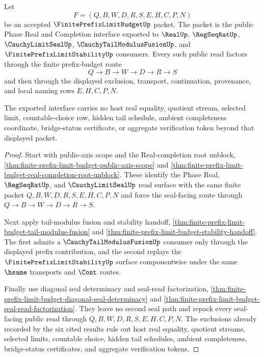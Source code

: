 \begin{theorem}
\label{thm:finite-prefix-limit-budget-public-interface-export}
Let
$$
F=(Q,B,W,D,R,S,E,H,C,P,N)
$$
be an accepted $\FinitePrefixLimitBudgetUp$ packet. The packet is the public Phase Real and Completion interface exported to $\RealUp$, $\RegSeqRatUp$, $\CauchyLimitSealUp$, $\CauchyTailModulusFusionUp$, and $\FinitePrefixLimitStabilityUp$ consumers. Every such public read factors through the finite prefix-budget route
$$
Q \to B \to W \to D \to R \to S
$$
and then through the displayed exclusion, transport, continuation, provenance, and local naming rows $E,H,C,P,N$.

The exported interface carries no host real equality, quotient stream, selected limit, countable-choice row, hidden tail schedule, ambient completeness coordinate, bridge-status certificate, or aggregate verification token beyond that displayed packet.
\end{theorem}
\begin{proof}
Start with public-axis scope and the Real-completion root unblock, \autoref{thm:finite-prefix-limit-budget-public-axis-scope} and \autoref{thm:finite-prefix-limit-budget-real-completion-root-unblock}. These identify the Phase Real, $\RegSeqRatUp$, and $\CauchyLimitSealUp$ read surface with the same finite packet $Q,B,W,D,R,S,E,H,C,P,N$ and force the seal-facing route through $Q \to B \to W \to D \to R \to S$.

Next apply tail-modulus fusion and stability handoff, \autoref{thm:finite-prefix-limit-budget-tail-modulus-fusion} and \autoref{thm:finite-prefix-limit-budget-stability-handoff}. The first admits a $\CauchyTailModulusFusionUp$ consumer only through the displayed prefix contribution, and the second replays the $\FinitePrefixLimitStabilityUp$ surface componentwise under the same $\hsame$ transports and $\Cont$ routes.

Finally use diagonal seal determinacy and seal-read factorization, \autoref{thm:finite-prefix-limit-budget-diagonal-seal-determinacy} and \autoref{thm:finite-prefix-limit-budget-seal-read-factorization}. They leave no second seal path and repack every seal-facing public read through $Q,B,W,D,R,S,E,H,C,P,N$. The exclusions already recorded by the six cited results rule out host real equality, quotient streams, selected limits, countable choice, hidden tail schedules, ambient completeness, bridge-status certificates, and aggregate verification tokens.
\end{proof}

